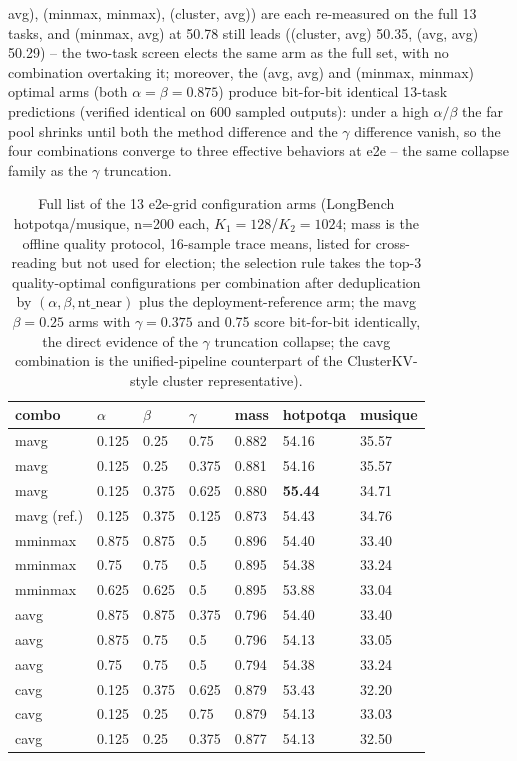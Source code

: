 \documentclass[11pt]{article}
\begin{document}
avg), (minmax, minmax), (cluster, avg)) are each re-measured on the full 13 tasks, and (minmax, avg) at 50.78 still leads ((cluster, avg) 50.35, (avg, avg) 50.29) -- the two-task screen elects the same arm as the full set, with no combination overtaking it; moreover, the (avg, avg) and (minmax, minmax) optimal arms (both $\alpha{=}\beta{=}0.875$) produce bit-for-bit identical 13-task predictions (verified identical on 600 sampled outputs): under a high $\alpha/\beta$ the far pool shrinks until both the method difference and the $\gamma$ difference vanish, so the four combinations converge to three effective behaviors at e2e -- the same collapse family as the $\gamma$ truncation.

\begin{table}[h]\centering
\small\setlength{\tabcolsep}{4pt}
\caption{Full list of the 13 e2e-grid configuration arms (LongBench hotpotqa/musique, n=200 each, $K_1{=}128$/$K_2{=}1024$; mass is the offline quality protocol, 16-sample trace means, listed for cross-reading but not used for election; the selection rule takes the top-3 quality-optimal configurations per combination after deduplication by $(\alpha,\beta,\mathrm{nt\_near})$ plus the deployment-reference arm; the mavg $\beta{=}0.25$ arms with $\gamma{=}0.375$ and 0.75 score bit-for-bit identically, the direct evidence of the $\gamma$ truncation collapse; the cavg combination is the unified-pipeline counterpart of the ClusterKV-style cluster representative).}
\label{tab:e2egrid}
\begin{tabular}{lllllll}
\toprule
combo & $\alpha$ & $\beta$ & $\gamma$ & mass & hotpotqa & musique \\
\midrule
mavg & 0.125 & 0.25 & 0.75 & 0.882 & 54.16 & 35.57 \\
mavg & 0.125 & 0.25 & 0.375 & 0.881 & 54.16 & 35.57 \\
mavg & 0.125 & 0.375 & 0.625 & 0.880 & \textbf{55.44} & 34.71 \\
mavg (ref.) & 0.125 & 0.375 & 0.125 & 0.873 & 54.43 & 34.76 \\
mminmax & 0.875 & 0.875 & 0.5 & 0.896 & 54.40 & 33.40 \\
mminmax & 0.75 & 0.75 & 0.5 & 0.895 & 54.38 & 33.24 \\
mminmax & 0.625 & 0.625 & 0.5 & 0.895 & 53.88 & 33.04 \\
aavg & 0.875 & 0.875 & 0.375 & 0.796 & 54.40 & 33.40 \\
aavg & 0.875 & 0.75 & 0.5 & 0.796 & 54.13 & 33.05 \\
aavg & 0.75 & 0.75 & 0.5 & 0.794 & 54.38 & 33.24 \\
cavg & 0.125 & 0.375 & 0.625 & 0.879 & 53.43 & 32.20 \\
cavg & 0.125 & 0.25 & 0.75 & 0.879 & 54.13 & 33.03 \\
cavg & 0.125 & 0.25 & 0.375 & 0.877 & 54.13 & 32.50 \\
\bottomrule
\end{tabular}
\end{table}
\end{document}
